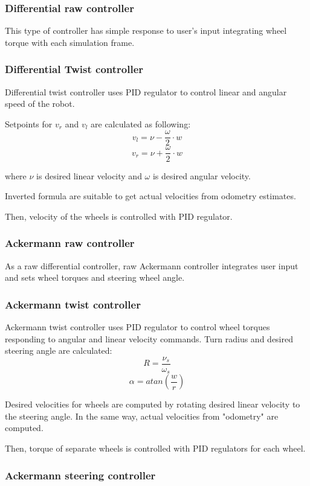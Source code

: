 \documentclass[a4paper,11pt]{article}
\begin{document}
\subsubsection{Differential raw controller}

This type of controller has simple response to user's input integrating wheel torque with each simulation frame.

\subsubsection{Differential Twist controller}

Differential twist controller uses PID regulator to control linear and angular speed of the robot.

Setpoints for $v_r$ and $v_l$ are calculated as following:
$$
v_l = \nu - \frac{\omega}{2} \cdot w
$$
$$
v_r = \nu + \frac{\omega}{2} \cdot w
$$

where $\nu$ is desired linear velocity and $\omega$ is desired angular velocity.


Inverted formula are suitable to get actual velocities from odometry estimates.


Then, velocity of the wheels is controlled with PID regulator.

\subsubsection{Ackermann raw controller}

As a raw differential controller, raw Ackermann controller integrates user input and sets wheel torques and steering wheel angle.

\subsubsection{Ackermann twist controller}

Ackermann twist controller uses PID regulator to control wheel torques responding to angular and linear velocity commands.
Turn radius and desired steering angle are calculated:
$$
R = \frac{\nu_s}{\omega_s}
$$
$$
\alpha = atan(\frac{w}{r})
$$

Desired velocities for wheels are computed by rotating desired linear velocity to the steering angle.
In the same way, actual velocities from "odometry" are computed.

Then, torque of separate wheels is controlled with PID regulators for each wheel.

\subsubsection{Ackermann steering controller}
\end{document}
